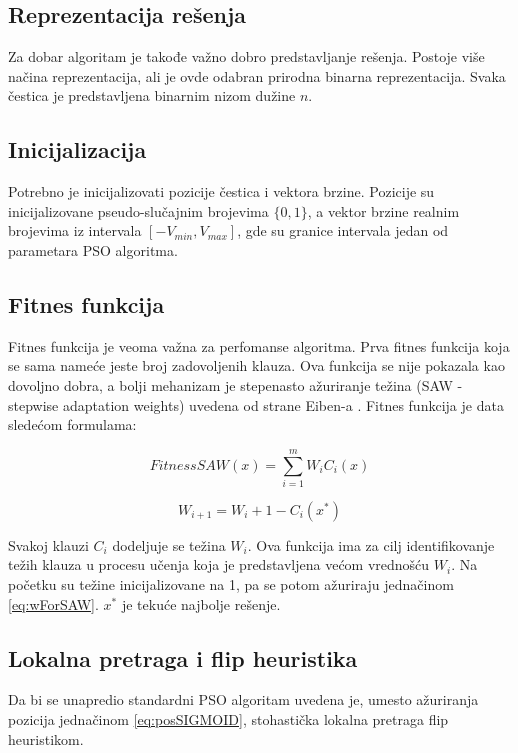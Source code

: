 \documentclass{article}
\begin{document}
\subsection{Reprezentacija rešenja}
Za dobar algoritam je takođe važno dobro predstavljanje rešenja. Postoje više načina reprezentacija, ali je ovde odabran prirodna binarna reprezentacija. Svaka čestica je predstavljena binarnim nizom dužine $n$.


\subsection{Inicijalizacija}
Potrebno je inicijalizovati pozicije čestica i vektora brzine. Pozicije su inicijalizovane pseudo-slučajnim brojevima $\{0,1\}$, a vektor brzine realnim brojevima iz intervala $[-V_{min}, V_{max}]$, gde su granice intervala jedan od parametara PSO algoritma.


\subsection{Fitnes funkcija}
Fitnes funkcija je veoma važna za perfomanse algoritma.
Prva fitnes funkcija koja se sama nameće jeste broj zadovoljenih klauza. Ova funkcija se nije pokazala kao dovoljno dobra, a bolji mehanizam je stepenasto ažuriranje težina (SAW - stepwise adaptation weights) uvedena od strane Eiben-a \cite{fitnes}. Fitnes funkcija je data sledećom formulama:

\begin{equation}\label{eq:SAW}
FitnessSAW(x) = \sum_{i=1}^{m} W_iC_i(x)
\end{equation}

\begin{equation}\label{eq:wForSAW}
W_{i+1} = W_{i} + 1 - C_i(x^*)
\end{equation}

Svakoj klauzi $C_i$ dodeljuje se težina $W_i$. Ova funkcija ima za cilj identifikovanje težih klauza u procesu učenja koja je predstavljena većom vrednošću $W_i$. Na početku su težine inicijalizovane na 1, pa se potom ažuriraju jednačinom \ref{eq:wForSAW}. $x^*$ je tekuće najbolje rešenje.


\subsection{Lokalna pretraga i flip heuristika}
Da bi se unapredio standardni PSO algoritam uvedena je, umesto ažuriranja pozicija jednačinom \ref{eq:posSIGMOID}, stohastička lokalna pretraga flip heuristikom.\\
\end{document}
